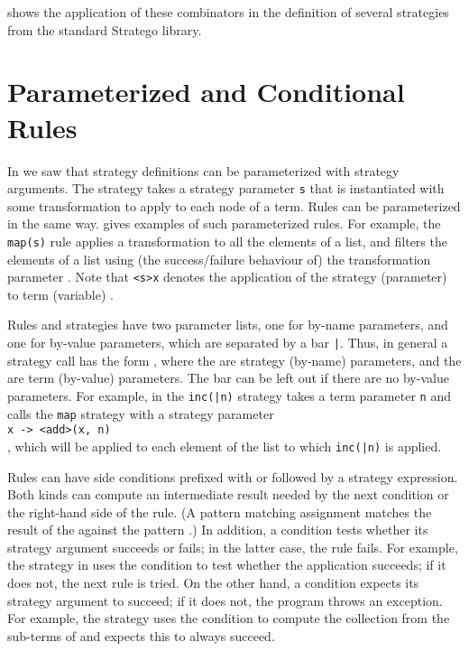  shows the application of these combinators in the
definition of several strategies from the standard Stratego library.

\section{Parameterized and Conditional Rules}

In  we saw that strategy definitions can be parameterized
with strategy arguments. The strategy  takes a strategy
parameter \texttt{s} that is instantiated with some transformation to apply to
each node of a term. Rules can be parameterized in the same way.
 gives examples of such parameterized rules. For
example, the \texttt{map(s)} rule applies a transformation  to all the
elements of a list, and  filters the elements of a list using
(the success/failure behaviour of) the transformation parameter . 
Note that \texttt{<s>x} denotes the application of the strategy (parameter)
 to term (variable) .

Rules and strategies have two parameter lists, one for by-name parameters, and
one for by-value parameters, which are separated by a bar \texttt{|}. Thus, in
general a strategy call has the form
, where the  are
strategy (by-name) parameters, and the  are term (by-value)
parameters. The bar can be left out if there are no by-value parameters.
For example, in the \texttt{inc(|n)} strategy takes a term parameter \texttt{n}
and calls the \texttt{map} strategy with a strategy parameter
\texttt{\\ x -> <add>(x, n) \\}, which will be applied to each element of the
list to which \texttt{inc(|n)} is applied.

Rules can have side conditions prefixed with  or 
followed by a strategy expression. Both kinds can compute an intermediate result
needed by the next condition or the right-hand side of the rule. (A pattern
matching assignment  matches the result of the 
against the pattern .) In addition, a  condition
tests whether its strategy argument succeeds or fails; in the latter case, the
rule fails. For example, the
 strategy in  uses the
condition  to test whether the application
 succeeds; if it does not, the next rule is tried. On the other
hand, a  condition expects its strategy argument  to
succeed; if it does not, the program throws an exception. For example, the
 strategy uses the condition  to compute the collection from the
sub-terms of  and expects this to always succeed.

